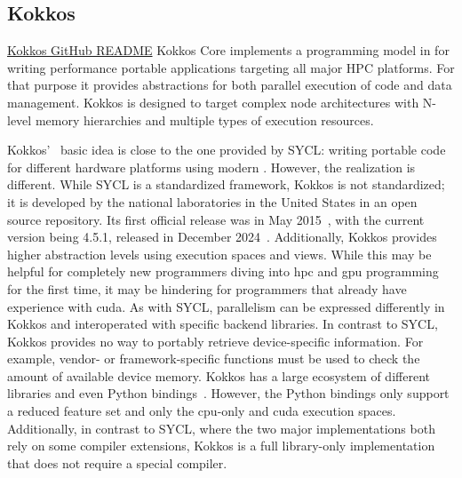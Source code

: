 \subsection{Kokkos}
\label{sec:frameworks:kokkos}

\begin{quotebox}{\href{https://github.com/kokkos/kokkos}{Kokkos GitHub README}}
    Kokkos Core implements a programming model in \cpp for writing performance portable applications targeting all major HPC platforms. For that purpose it provides abstractions for both parallel execution of code and data management. Kokkos is designed to target complex node architectures with N-level memory hierarchies and multiple types of execution resources.
\end{quotebox}

Kokkos'~\cite{trott_kokkos_2022} basic idea is close to the one provided by SYCL: writing portable code for different hardware platforms using modern \cpp. 
However, the realization is different. 
While SYCL is a standardized framework, Kokkos is not standardized; it is developed by the national laboratories in the United States in an open source repository. 
Its first official release was in May 2015~\cite{trott_kokkos_2015, carter_edwards_kokkos_2014}, with the current version being 4.5.1, released in December 2024~\cite{noauthor_release_2024}. 
Additionally, Kokkos provides higher abstraction levels using execution spaces and views. 
While this may be helpful for completely new programmers diving into \gls{hpc} and \gls{gpu} programming for the first time, it may be hindering for programmers that already have experience with \gls{cuda}. 
As with SYCL, parallelism can be expressed differently in Kokkos and interoperated with specific backend libraries. 
In contrast to SYCL, Kokkos provides no way to portably retrieve device-specific information. 
For example, vendor- or framework-specific functions must be used to check the amount of available device memory. 
Kokkos has a large ecosystem of different libraries and even Python bindings~\cite{al_awar_performance_2021}.
However, the Python bindings only support a reduced feature set and only the \gls{cpu}-only and \gls{cuda} execution spaces. 
Additionally, in contrast to SYCL, where the two major implementations both rely on some compiler extensions, Kokkos is a full library-only implementation that does not require a special compiler. 

